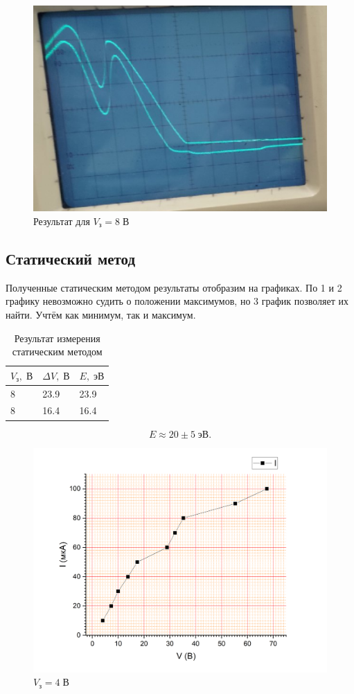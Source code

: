 \documentclass[a4paper]{article}
\begin{document}
\begin{figure}[tbh]
	\centering
	\includegraphics[width=0.7\linewidth]{Screenshot_6}
	\caption{Результат для $V_з = 8\; В$}
	\label{fig:screenshot6}
\end{figure}

\subsection{Статический метод}

Полученные статическим методом результаты отобразим на графиках. По 1 и 2 графику невозможно судить о положении максимумов, но 3 график позволяет их найти. Учтём как минимум, так и максимум.

\begin{table}[h]
	\centering
	\begin{tabular}{|l|l|l|}
		\hline
		$V_з, \;В$ & $\Delta V, \; В$ & $E,\; эВ$ \\ \hline
		8          & 23.9             & 23.9        \\ \hline
		8          & 16.4             & 16.4      \\ \hline
	\end{tabular}
	\caption{Результат измерения статическим методом}
	\label{tab:my-table}
\end{table}

\begin{equation}\label{key}
	E\approx 20\pm 5 \; эВ.
\end{equation}

\begin{figure}[tbh]
	\centering
	\includegraphics[width=0.7\linewidth]{Graph1}
	\caption{$V_з = 4 \;В$}
	\label{fig:graph1}
\end{figure}
\end{document}
